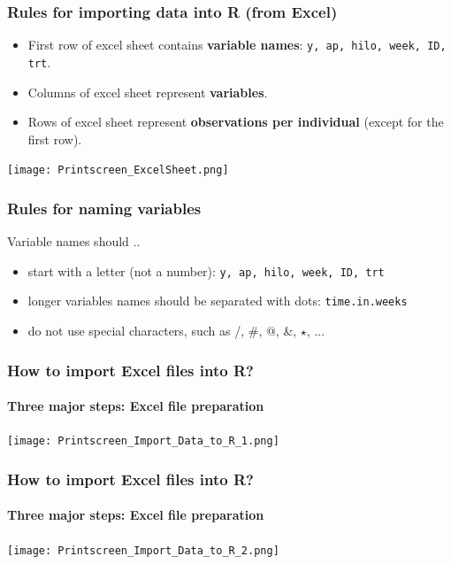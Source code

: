 \documentclass{beamer}\usepackage[]{graphicx}\usepackage[]{color}
\begin{document}
{{{%

\begin{frame}[fragile]
\frametitle{Rules for importing data into R (from Excel)}
\begin{itemize}
\item First row of excel sheet contains \textbf{variable names}: \newline
\texttt{y, ap, hilo, week, ID, trt}.
\item Columns of excel sheet represent \textbf{variables}.
\item Rows of excel sheet represent \textbf{observations per individual}
(except for the first row).
\end{itemize}
\begin{center}
\texttt{[image: Printscreen\_ExcelSheet.png]}
\end{center}
\end{frame}


\begin{frame}[fragile]
\frametitle{Rules for naming variables}
Variable names should ..
\begin{itemize}
\item start with a letter (not a number): \texttt{y, ap, hilo, week, ID, trt}
\item longer variables names should be separated with dots: \texttt{time.in.weeks}
\item do not use special characters, such as /, \#, $@$, \&, $\star$, ...
\end{itemize}
\end{frame}


\begin{frame}[fragile]
\frametitle{How to import Excel files into R?}
\framesubtitle{Three major steps: Excel file preparation}
\begin{center}
\texttt{[image: Printscreen\_Import\_Data\_to\_R\_1.png]}
\end{center}
\end{frame}


\begin{frame}[fragile]
\frametitle{How to import Excel files into R?}
\framesubtitle{Three major steps: Excel file preparation}
\begin{center}
\texttt{[image: Printscreen\_Import\_Data\_to\_R\_2.png]}
\end{center}
\end{frame}

}}}
\end{document}

